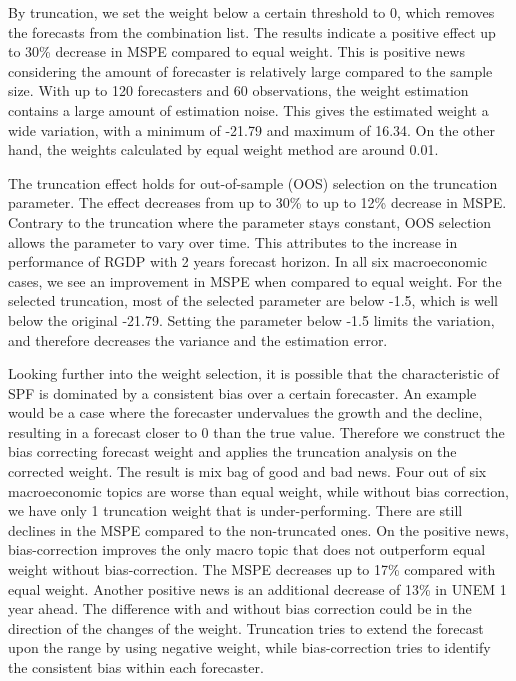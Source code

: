 \documentclass[11pt]{article}
\begin{document}
By truncation, we set the weight below a certain threshold to 0, which removes the forecasts from the combination list. The results indicate a positive effect up to 30\% decrease in MSPE compared to equal weight. 
This is positive news considering the amount of forecaster is relatively large compared to the sample size. 
With up to 120 forecasters and 60 observations, the weight estimation contains a large amount of estimation noise.
This gives the estimated weight a wide variation, with a minimum of -21.79 and maximum of 16.34. On the other hand, the weights calculated by equal weight method are around 0.01.

The truncation effect holds for out-of-sample (OOS) selection on the truncation parameter. The effect decreases from up to 30\% to up to 12\% decrease in MSPE. Contrary to the truncation where the parameter stays constant, OOS selection allows the parameter to vary over time. This attributes to the increase in performance of RGDP with 2 years forecast horizon. In all six macroeconomic cases, we see an improvement in MSPE when compared to equal weight. For the selected truncation, most of the selected parameter are below -1.5, which is well below the original -21.79. Setting the parameter below -1.5 limits the variation, and therefore decreases the variance and the estimation error.

Looking further into the weight selection, it is possible that the characteristic of SPF is dominated by a consistent bias over a certain forecaster. An example would be a case where the forecaster undervalues the growth and the decline, resulting in a forecast closer to 0 than the true value. Therefore we construct the bias correcting forecast weight and applies the truncation analysis on the corrected weight. The result is mix bag of good and bad news. Four out of six macroeconomic topics are worse than equal weight, while without bias correction, we have only 1 truncation weight that is under-performing. There are still declines in the MSPE compared to the non-truncated ones. On the positive news, bias-correction improves the only macro topic that does not outperform equal weight without bias-correction. The MSPE decreases up to 17\% compared with equal weight. Another positive news is an additional decrease of 13\% in UNEM 1 year ahead. The difference with and without bias correction could be in the direction of the changes of the weight. Truncation tries to extend the forecast upon the range by using negative weight, while bias-correction tries to identify the consistent bias within each forecaster.
\end{document}
